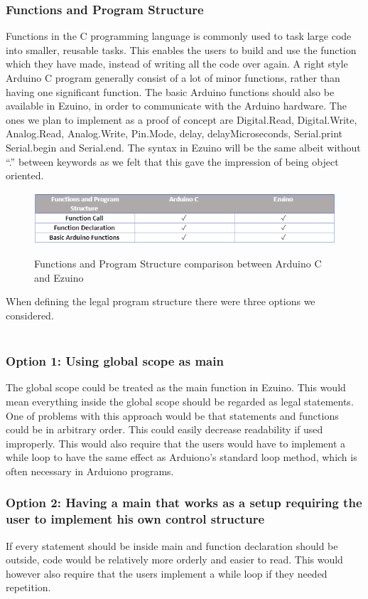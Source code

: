 \subsubsection*{Functions and Program Structure}
Functions in the C programming language is commonly used to task large code into smaller, reusable tasks. This enables the users to build and use the function which they have made, instead of writing all the code over again. A right style Arduino C program generally consist of a lot of minor functions, rather than having one significant function.
The basic Arduino functions should also be available in Ezuino, in order to communicate with the Arduino hardware. The ones we plan to implement as a proof of concept are Digital.Read, Digital.Write, Analog.Read, Analog.Write, Pin.Mode, delay, delayMicroseconds, Serial.print Serial.begin and Serial.end. The syntax in Ezuino will be the same albeit without “.” between keywords as we felt that this gave the impression of being object oriented.
\begin{figure}[H]
\centering
\caption{Functions and Program Structure comparison between Arduino C and Ezuino}
\includegraphics[scale=0.80]{figures/language_features/langf10.png}
\label{lf10}
\end{figure}
When defining the legal program structure there were three options we considered. \\ \\
\subsubsection{Option 1: Using global scope as main}
The global scope could be treated as the main function in Ezuino. This would mean everything inside the global scope should be regarded as legal statements. One of problems with this approach would be that statements and functions could be in arbitrary order. This could easily decrease readability if used improperly.
This would also require that the users would have to implement a while loop to have the same effect as Arduiono’s standard loop method, which is often necessary in Arduiono programs.


\subsubsection{Option 2: Having a main that works as a setup requiring the user to implement his own control structure}
If every statement should be inside main and function declaration should be outside, code would be relatively more orderly and easier to read.
This would however also require that the users implement a while loop if they needed repetition.


